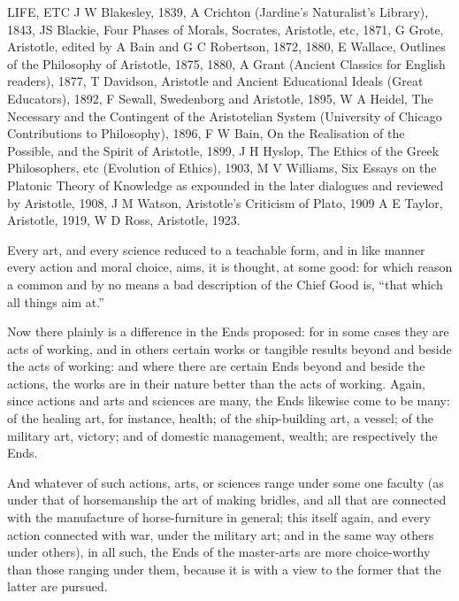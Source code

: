 LIFE, ETC J W Blakesley, 1839, A Crichton (Jardine’s Naturalist’s
Library), 1843, JS Blackie, Four Phases of Morals, Socrates, Aristotle, etc,
1871, G Grote, Aristotle, edited by A Bain and G C Robertson, 1872, 1880, E
Wallace, Outlines of the Philosophy of Aristotle, 1875, 1880, A Grant (Ancient
Classics for English readers), 1877, T Davidson, Aristotle and Ancient
Educational Ideals (Great Educators), 1892, F Sewall, Swedenborg and Aristotle,
1895, W A Heidel, The Necessary and the Contingent of the Aristotelian System
(University of Chicago Contributions to Philosophy), 1896, F W Bain, On the
Realisation of the Possible, and the Spirit of Aristotle, 1899, J H Hyslop, The
Ethics of the Greek Philosophers, etc (Evolution of Ethics), 1903, M V
Williams, Six Essays on the Platonic Theory of Knowledge as expounded in the
later dialogues and reviewed by Aristotle, 1908, J M Watson, Aristotle’s
Criticism of Plato, 1909 A E Taylor, Aristotle, 1919, W D Ross, Aristotle,
1923.



Every art, and every science reduced to a teachable form, and in like manner
every action and moral choice, aims, it is thought, at some good: for which
reason a common and by no means a bad description of the Chief Good is,
“that which all things aim at.”

Now there plainly is a difference in the Ends proposed: for in some cases they
are acts of working, and in others certain works or tangible results beyond and
beside the acts of working: and where there are certain Ends beyond and beside
the actions, the works are in their nature better than the acts of working.
Again, since actions and arts and sciences are many, the Ends likewise come to
be many: of the healing art, for instance, health; of the ship-building art, a
vessel; of the military art, victory; and of domestic management, wealth; are
respectively the Ends.

And whatever of such actions, arts, or sciences range under some one faculty
(as under that of horsemanship the art of making bridles, and all that are
connected with the manufacture of horse-furniture in general; this itself
again, and every action connected with war, under the military art; and in the
same way others under others), in all such, the Ends of the master-arts are
more choice-worthy than those ranging under them, because it is with a view to
the former that the latter are pursued.

